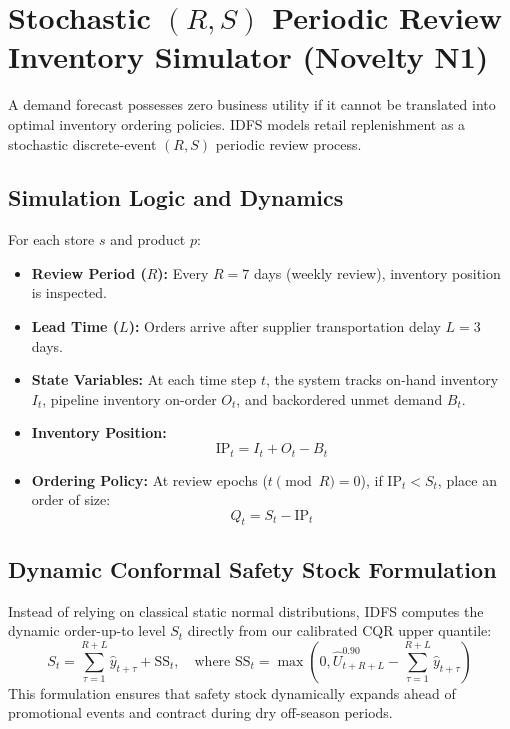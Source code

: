 \documentclass[12pt,a4paper,oneside]{report}
\theoremstyle{definition}
\begin{document}
\section{Stochastic $(R, S)$ Periodic Review Inventory Simulator (Novelty N1)}
A demand forecast possesses zero business utility if it cannot be translated into optimal inventory ordering policies. IDFS models retail replenishment as a stochastic discrete-event $(R, S)$ periodic review process.

\subsection{Simulation Logic and Dynamics}
For each store $s$ and product $p$:
\begin{itemize}[itemsep=0.15cm]
    \item \textbf{Review Period ($R$):} Every $R = 7$ days (weekly review), inventory position is inspected.
    \item \textbf{Lead Time ($L$):} Orders arrive after supplier transportation delay $L = 3$ days.
    \item \textbf{State Variables:} At each time step $t$, the system tracks on-hand inventory $I_t$, pipeline inventory on-order $O_t$, and backordered unmet demand $B_t$.
    \item \textbf{Inventory Position:}
    \begin{equation}
    \text{IP}_t = I_t + O_t - B_t
    \end{equation}
    \item \textbf{Ordering Policy:} At review epochs ($t \pmod R = 0$), if $\text{IP}_t < S_t$, place an order of size:
    \begin{equation}
    Q_t = S_t - \text{IP}_t
    \end{equation}
\end{itemize}

\subsection{Dynamic Conformal Safety Stock Formulation}
Instead of relying on classical static normal distributions, IDFS computes the dynamic order-up-to level $S_t$ directly from our calibrated CQR upper quantile:
\begin{equation}
S_t = \sum_{\tau=1}^{R+L} \hat{y}_{t+\tau} + \text{SS}_t, \quad \text{where } \text{SS}_t = \max\left(0, \hat{U}_{t+R+L}^{0.90} - \sum_{\tau=1}^{R+L} \hat{y}_{t+\tau}\right)
\end{equation}
This formulation ensures that safety stock dynamically expands ahead of promotional events and contract during dry off-season periods.
\end{document}
